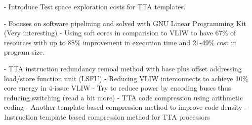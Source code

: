 \autocite{840031}  - Introduce Test space exploration costs for TTA templates.


\autocite{4595596} - Focuses on software pipelining and solved with GNU Linear Programming Kit (Very interesting)
\autocite{8425389} - Using soft cores in comparision to VLIW to have 67\% of resources with up to 88\% improvement in execution time and 21-49\% cost in program size.


\autocite{5403730} - TTA instruction redundancy remoal method with base plus offset addressing load/store function unit (LSFU)
\autocite{6972455} - Reducing VLIW interconnects to achieve 10\% core energy in 4-issue VLIW
\autocite{1207041} - Try to reduce power by encoding buses thus reducing switching (read a bit more)
\autocite{4627144} - TTA code compression using arithmetic coding
\autocite{1213033} - Another template based compression method to improve code density
\autocite{6893206} - Instruction template based compression method for TTA processors
\fi